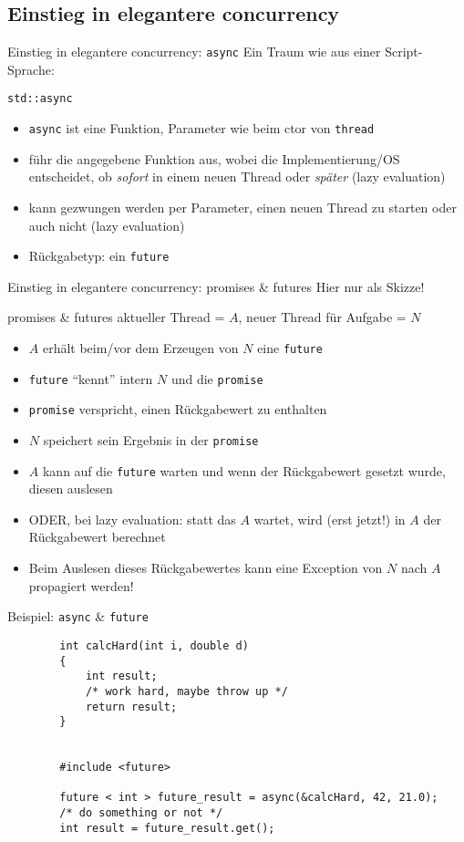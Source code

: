 \subsection{Einstieg in elegantere concurrency}

\begin{frame}{Einstieg in elegantere concurrency: \texttt{async}}
	Ein Traum wie aus einer Script-Sprache:
	\begin{block}{ \texttt{std::async} }
		\begin{itemize}
			\item \texttt{async} ist eine Funktion, Parameter wie beim ctor von \texttt{thread}
			\item führ die angegebene Funktion aus, wobei die Implementierung/OS entscheidet, ob \emph{sofort} in einem neuen Thread oder \emph{später} (lazy evaluation)
			\item kann gezwungen werden per Parameter, einen neuen Thread zu starten oder auch nicht (lazy evaluation)
			\item Rückgabetyp: ein \texttt{future}
		\end{itemize}
	\end{block}
\end{frame}

\begin{frame}{Einstieg in elegantere concurrency: promises \& futures}
	Hier nur als Skizze!
	
	\begin{block}{promises \& futures}
		aktueller Thread = $A$, neuer Thread für Aufgabe = $N$
		\begin{itemize}
			\item $A$ erhält beim/vor dem Erzeugen von $N$ eine \texttt{future}
			\item \texttt{future} \enquote{kennt} intern $N$ und die \texttt{promise}
			\item \texttt{promise} verspricht, einen Rückgabewert zu enthalten
			\item<2-> $N$ speichert sein Ergebnis in der \texttt{promise}
			\item<3-> $A$ kann auf die \texttt{future} warten und wenn der Rückgabewert gesetzt wurde, diesen auslesen
			\item<3-> ODER, bei lazy evaluation: statt das $A$ wartet, wird (erst jetzt!) in $A$ der Rückgabewert berechnet
			\item<4-> Beim Auslesen dieses Rückgabewertes kann eine Exception von $N$ nach $A$ propagiert werden!
		\end{itemize}
	\end{block}
\end{frame}

\begin{frame}[fragile]{ Beispiel: \texttt{async} \& \texttt{future} }
	\begin{lstlisting}
		int calcHard(int i, double d)
		{
			int result;
			/* work hard, maybe throw up */
			return result;
		}
		
		
		#include <future>
		
		future < int > future_result = async(&calcHard, 42, 21.0);
		/* do something or not */
		int result = future_result.get();
	\end{lstlisting}
\end{frame}
